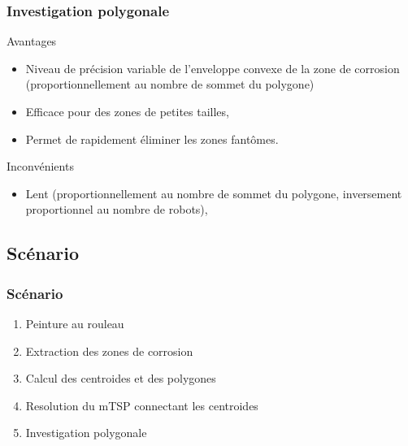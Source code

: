\documentclass{beamer}
\begin{document}
			\begin{frame}
				\frametitle{Investigation polygonale}
				\begin{exampleblock}{Avantages}
					\begin{itemize}
						\item Niveau de précision variable de l'enveloppe convexe de la zone de corrosion (proportionnellement au nombre de sommet du polygone)
						\item Efficace pour des zones de petites tailles,
						\item Permet de rapidement éliminer les zones fantômes.
					\end{itemize}
				\end{exampleblock}
				\begin{alertblock}{Inconvénients}
					\begin{itemize}
						\item Lent (proportionnellement au nombre de sommet du polygone, inversement proportionnel au nombre de robots),
					\end{itemize}
				\end{alertblock}
			\end{frame}
		\subsection{Scénario}
			\begin{frame}
				\frametitle{Scénario}
				\begin{enumerate}
					\item Peinture au rouleau
					\item Extraction des zones de corrosion
					\item Calcul des centroides et des polygones
					\item Resolution du mTSP connectant les centroides
					\item Investigation polygonale
				\end{enumerate}
			\end{frame}
\end{document}
